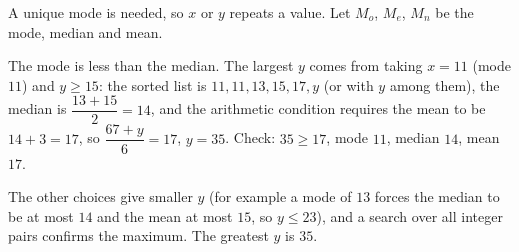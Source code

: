 A unique mode is needed, so $x$ or $y$ repeats a value. Let $M_o$, $M_e$, $M_n$ be the mode, median and mean.

The mode is less than the median. The largest $y$ comes from taking $x=11$ (mode $11$) and $y\ge15$: the sorted list is $11,11,13,15,17,y$ (or with $y$ among them), the median is $\dfrac{13+15}{2}=14$, and the arithmetic condition requires the mean to be $14+3=17$, so $\dfrac{67+y}{6}=17$, $y=35$. Check: $35\ge17$, mode $11$, median $14$, mean $17$. \checkmark

The other choices give smaller $y$ (for example a mode of $13$ forces the median to be at most $14$ and the mean at most $15$, so $y\le23$), and a search over all integer pairs confirms the maximum. The greatest $y$ is $\boxed{35}$.
